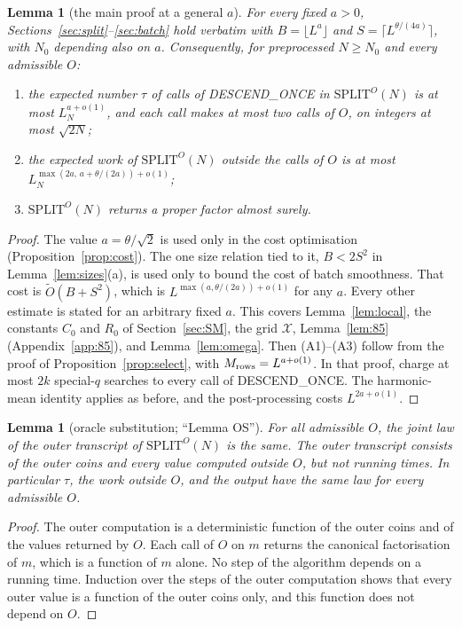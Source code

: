 \documentclass[11pt]{amsart}
\newtheorem{lemma}[theorem]{Lemma}
\theoremstyle{definition}
\newcommand{\cX}{\mathcal{X}}
\begin{document}
\begin{lemma}[the main proof at a general $a$]\label{lem:generala}
For every fixed $a>0$, Sections~\ref{sec:split}--\ref{sec:batch} hold verbatim with $B=\lfloor L^a\rfloor$ and $S=\lceil L^{\theta/(4a)}\rceil$, with $N_0$
depending also on $a$. Consequently, for preprocessed $N\ge N_0$ and every admissible $O$:
\begin{enumerate}[label=(A\arabic*)]
\item the expected number $\tau$ of calls of DESCEND\_ONCE in $\mathrm{SPLIT}^O(N)$ is at most $L_N^{a+o(1)}$, and each call makes at most two calls
  of $O$, on integers at most $\sqrt{2N}$;
\item the expected work of $\mathrm{SPLIT}^O(N)$ outside the calls of $O$ is at most $L_N^{\max(2a,\,a+\theta/(2a))+o(1)}$;
\item $\mathrm{SPLIT}^O(N)$ returns a proper factor almost surely.
\end{enumerate}
\end{lemma}

\begin{proof}
The value $a=\theta/\sqrt2$ is used only in the cost optimisation (Proposition~\ref{prop:cost}). The one size relation tied to it,
$B<2S^2$ in Lemma~\ref{lem:sizes}(a), is used only to bound the cost of batch smoothness. That cost is $\tilde O(B+S^2)$, which is
$L^{\max(a,\theta/(2a))+o(1)}$ for any $a$. Every other estimate is stated for an arbitrary fixed $a$. This covers
Lemma~\ref{lem:local}, the constants $C_0$ and $R_0$ of Section~\ref{sec:SM}, the grid $\cX$, Lemma~\ref{lem:85}
(Appendix~\ref{app:85}), and Lemma~\ref{lem:omega}. Then (A1)--(A3) follow from the proof of Proposition~\ref{prop:select}, with
$M_{\rm rows}=L^{a+o(1)}$. In that proof, charge at most $2k$ special-$q$ searches to every call of DESCEND\_ONCE. The
harmonic-mean identity applies as before, and the post-processing costs $L^{2a+o(1)}$.
\end{proof}

\begin{lemma}[oracle substitution; ``Lemma OS'']\label{lem:OS}
For all admissible $O$, the joint law of the outer transcript of $\mathrm{SPLIT}^O(N)$ is the same. The outer transcript consists of
the outer coins and every value computed outside $O$, but not running times. In particular $\tau$, the work outside $O$, and the
output have the same law for every admissible $O$.
\end{lemma}

\begin{proof}
The outer computation is a deterministic function of the outer coins and of the values returned by $O$. Each call of $O$ on $m$ returns
the canonical factorisation of $m$, which is a function of $m$ alone. No step of the algorithm depends on a running time. Induction over the
steps of the outer computation shows that every outer value is a function of the outer coins only, and this function does not depend on $O$.
\end{proof}
\end{document}

